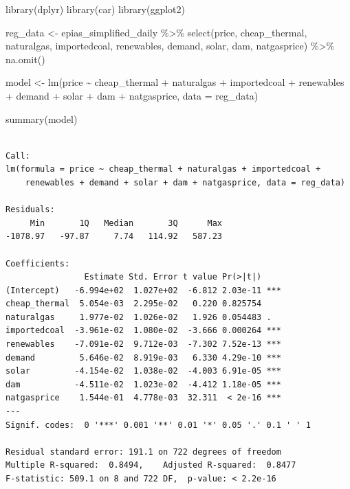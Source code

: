 \documentclass[
]{article}
\newenvironment{Shaded}{\begin{snugshade}}{\end{snugshade}}
\newcommand{\AttributeTok}[1]{\textcolor[rgb]{0.40,0.45,0.13}{#1}}
\newcommand{\FunctionTok}[1]{\textcolor[rgb]{0.28,0.35,0.67}{#1}}
\newcommand{\NormalTok}[1]{\textcolor[rgb]{0.00,0.23,0.31}{#1}}
\newcommand{\OtherTok}[1]{\textcolor[rgb]{0.00,0.23,0.31}{#1}}
\newcommand{\SpecialCharTok}[1]{\textcolor[rgb]{0.37,0.37,0.37}{#1}}
\begin{document}
\begin{Shaded}
\begin{Highlighting}[]
\FunctionTok{library}\NormalTok{(dplyr)}
\FunctionTok{library}\NormalTok{(car)}
\FunctionTok{library}\NormalTok{(ggplot2)}

\NormalTok{reg\_data }\OtherTok{\textless{}{-}}\NormalTok{ epias\_simplified\_daily }\SpecialCharTok{\%\textgreater{}\%}
  \FunctionTok{select}\NormalTok{(price, cheap\_thermal, naturalgas, importedcoal, renewables, demand, solar, dam, natgasprice) }\SpecialCharTok{\%\textgreater{}\%}
  \FunctionTok{na.omit}\NormalTok{()}


\NormalTok{model }\OtherTok{\textless{}{-}} \FunctionTok{lm}\NormalTok{(price }\SpecialCharTok{\textasciitilde{}}\NormalTok{ cheap\_thermal }\SpecialCharTok{+}\NormalTok{ naturalgas }\SpecialCharTok{+}\NormalTok{ importedcoal }\SpecialCharTok{+}\NormalTok{ renewables }\SpecialCharTok{+}\NormalTok{ demand }\SpecialCharTok{+}\NormalTok{ solar }\SpecialCharTok{+}\NormalTok{ dam }\SpecialCharTok{+}\NormalTok{ natgasprice, }\AttributeTok{data =}\NormalTok{ reg\_data)}

\FunctionTok{summary}\NormalTok{(model)}
\end{Highlighting}
\end{Shaded}

\begin{verbatim}

Call:
lm(formula = price ~ cheap_thermal + naturalgas + importedcoal + 
    renewables + demand + solar + dam + natgasprice, data = reg_data)

Residuals:
     Min       1Q   Median       3Q      Max 
-1078.97   -97.87     7.74   114.92   587.23 

Coefficients:
                Estimate Std. Error t value Pr(>|t|)    
(Intercept)   -6.994e+02  1.027e+02  -6.812 2.03e-11 ***
cheap_thermal  5.054e-03  2.295e-02   0.220 0.825754    
naturalgas     1.977e-02  1.026e-02   1.926 0.054483 .  
importedcoal  -3.961e-02  1.080e-02  -3.666 0.000264 ***
renewables    -7.091e-02  9.712e-03  -7.302 7.52e-13 ***
demand         5.646e-02  8.919e-03   6.330 4.29e-10 ***
solar         -4.154e-02  1.038e-02  -4.003 6.91e-05 ***
dam           -4.511e-02  1.023e-02  -4.412 1.18e-05 ***
natgasprice    1.544e-01  4.778e-03  32.311  < 2e-16 ***
---
Signif. codes:  0 '***' 0.001 '**' 0.01 '*' 0.05 '.' 0.1 ' ' 1

Residual standard error: 191.1 on 722 degrees of freedom
Multiple R-squared:  0.8494,    Adjusted R-squared:  0.8477 
F-statistic: 509.1 on 8 and 722 DF,  p-value: < 2.2e-16
\end{verbatim}
\end{document}
